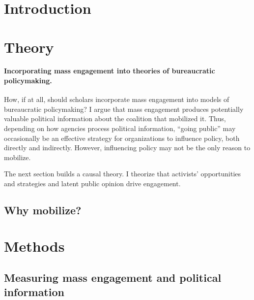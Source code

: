 \documentclass{article}
\begin{document}
\newpage
\section{Introduction} \label{intro}


\section{Theory} 
\paragraph{Incorporating mass engagement into theories of bureaucratic policymaking.}
How, if at all, should scholars incorporate mass engagement into models of bureaucratic policymaking? 
 I argue that mass engagement produces potentially valuable political information about the coalition that mobilized it.
Thus, depending on how agencies process political information, ``going public'' may occasionally be an effective strategy for organizations to influence policy, both directly and indirectly. However, influencing policy may not be the only reason to mobilize. 

The next section builds a causal theory. I theorize that activists' opportunities and strategies and latent public opinion drive engagement.



\subsection{Why mobilize?} \label{whymail-intro}




\section{Methods}

\subsection{Measuring mass engagement and political information}
\label{whyMail-methods}

\end{document}
